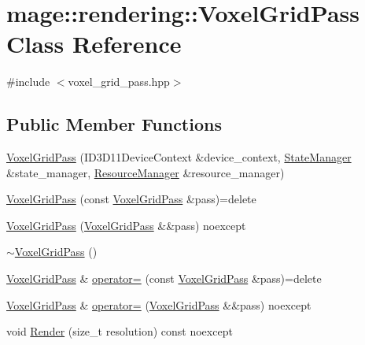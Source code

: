 \hypertarget{classmage_1_1rendering_1_1_voxel_grid_pass}{}\section{mage\+:\+:rendering\+:\+:Voxel\+Grid\+Pass Class Reference}
\label{classmage_1_1rendering_1_1_voxel_grid_pass}


{\ttfamily \#include $<$voxel\+\_\+grid\+\_\+pass.\+hpp$>$}

\subsection*{Public Member Functions}
\begin{DoxyCompactItemize}
\item 
\mbox{\hyperlink{classmage_1_1rendering_1_1_voxel_grid_pass_ad748e2aaccd4d34bcf5216815fe6d56f}{Voxel\+Grid\+Pass}} (I\+D3\+D11\+Device\+Context \&device\+\_\+context, \mbox{\hyperlink{classmage_1_1rendering_1_1_state_manager}{State\+Manager}} \&state\+\_\+manager, \mbox{\hyperlink{classmage_1_1rendering_1_1_resource_manager}{Resource\+Manager}} \&resource\+\_\+manager)
\item 
\mbox{\hyperlink{classmage_1_1rendering_1_1_voxel_grid_pass_a573934af1f4c245a1e544af785380267}{Voxel\+Grid\+Pass}} (const \mbox{\hyperlink{classmage_1_1rendering_1_1_voxel_grid_pass}{Voxel\+Grid\+Pass}} \&pass)=delete
\item 
\mbox{\hyperlink{classmage_1_1rendering_1_1_voxel_grid_pass_a08071670f68b888089b3f945c4ee2dc1}{Voxel\+Grid\+Pass}} (\mbox{\hyperlink{classmage_1_1rendering_1_1_voxel_grid_pass}{Voxel\+Grid\+Pass}} \&\&pass) noexcept
\item 
\mbox{\hyperlink{classmage_1_1rendering_1_1_voxel_grid_pass_a64361ec102c8f3f30d1e0d8edac33e5a}{$\sim$\+Voxel\+Grid\+Pass}} ()
\item 
\mbox{\hyperlink{classmage_1_1rendering_1_1_voxel_grid_pass}{Voxel\+Grid\+Pass}} \& \mbox{\hyperlink{classmage_1_1rendering_1_1_voxel_grid_pass_a6f696f05c430a0b84d8346099ec7d0aa}{operator=}} (const \mbox{\hyperlink{classmage_1_1rendering_1_1_voxel_grid_pass}{Voxel\+Grid\+Pass}} \&pass)=delete
\item 
\mbox{\hyperlink{classmage_1_1rendering_1_1_voxel_grid_pass}{Voxel\+Grid\+Pass}} \& \mbox{\hyperlink{classmage_1_1rendering_1_1_voxel_grid_pass_a9902536630f500e2399cbf7dd0e60452}{operator=}} (\mbox{\hyperlink{classmage_1_1rendering_1_1_voxel_grid_pass}{Voxel\+Grid\+Pass}} \&\&pass) noexcept
\item 
void \mbox{\hyperlink{classmage_1_1rendering_1_1_voxel_grid_pass_aba53961c9a9082c1382484329129e190}{Render}} (size\+\_\+t resolution) const noexcept
\end{DoxyCompactItemize}
